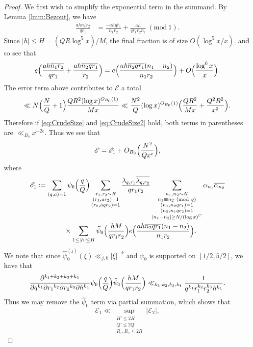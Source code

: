 \documentclass[10pt]{amsart}
\theoremstyle{plain}
\numberwithin{equation}{section}
\newcommand{\Mod}[1]{\ (\mathrm{mod}\ #1)}
\renewcommand{\hat}[1]{\widehat #1}
\begin{document}
%
%
%
%
\begin{proof}
We first wish to simplify the exponential term in the summand. By Lemma \ref{lmm:Bezout}, we have
\begin{align*}
\frac{ah\overline{n_1 r_2}}{q r_1}&=\frac{-ah\overline{q r_1}}{n_1 r_2}+\frac{ah}{q r_1 r_2 n_1}\Mod{1}.
\end{align*}
Since $|h|\le H=(QR\log^5{x})/M$, the final fraction is of size $O(\log^5{x}/x)$, and so see that
\[
e\Bigl(\frac{ah\overline{n_1r_2}}{q r_1}+\frac{ah \overline{n_2 qr_1}}{r_2}\Big)=e\Bigl(\frac{ ah\overline{n_2 q r_1}(n_1-n_2)}{n_1 r_2}\Bigr)+O\Bigl(\frac{\log^6{x}}{x}\Bigr).
\]
The error term above contributes to $\mathscr{E}$ a total
\[
\ll N\Bigl(\frac{N}{Q}+1\Bigr)\frac{Q R^2(\log{x})^{O_{B_0}(1)}}{M x}\ll \frac{N^2}{Q}(\log{x})^{O_{B_0}(1)}\Bigl(\frac{Q  R^2}{M x}+\frac{Q^2 R^2}{x^2}\Bigr).
\]
Therefore if \eqref{eq:CrudeSize} and \eqref{eq:CrudeSize2} hold, both terms in parentheses are $\ll_{B_0}x^{-2\epsilon}$. Thus we see that
\[
\mathscr{E}=\mathscr{E}_1+O_{B_0}\Bigl(\frac{N^2}{Q x^\epsilon}\Bigr),
\]
where
\begin{align*}
\mathscr{E}_1&:=\sum_{\substack{ (q,a)=1}}\psi_0\Bigl(\frac{q}{Q}\Bigr)\sum_{\substack{r_1,r_2\sim R\\ (r_1,a r_2)=1\\ (r_2,a q r_2)=1}}\frac{\lambda_{q,r_1}\overline{\lambda_{q,r_2}}}{q r_1 r_2}\sum_{\substack{n_1,n_2\sim N\\ n_1\equiv n_2\Mod{q}\\ (n_1,n_2qr_1)=1\\(n_2,n_1qr_2)=1\\ |n_1-n_2|\ge N/(\log{x})^C}}\alpha_{n_1}\overline{\alpha_{n_2}}\\
&\qquad\qquad\times\sum_{1\le |h|\le H}\hat{\psi}_0\Bigl(\frac{h M}{q r_1 r_2}\Bigr)e\Bigl(\frac{ ah\overline{n_2 q r_1}(n_1-n_2)}{n_1 r_2}\Bigr).
\end{align*}
We note that since $\hat{\psi_0}^{(j)}(\xi)\ll_{j,k} |\xi|^{-k}$ and $\psi_0$ is supported on $[1/2,5/2]$, we have that
\[
\frac{\partial^{k_1+k_2+k_3+k_4}}{\partial q^{k_1}\partial r_1{}^{k_2}\partial r_2{}^{k_3} \partial h^{k_4}}\psi_0\Bigl(\frac{q}{Q}\Bigr)\hat{\psi}_0\Bigl(\frac{h M}{q r_1 r_2}\Bigr)\ll_{k_1,k_2,k_3,k_4} \frac{1}{q^{k_1}r_1^{k_2} r_2^{k_3} h^{k_4}}.
\]
Thus we may remove the $\hat{\psi_0}$ term via partial summation, which shows that
\[
\mathscr{E}_1\ll \sup_{\substack{H'\le 2H\\ Q'\le 2Q\\ R_1,R_2\le 2R}}|\mathscr{E}_2|,
\]
\end{proof}
\end{document}
